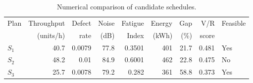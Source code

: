 \begin{table}[htbp]
\centering
\caption{Numerical comparison of candidate schedules.}
\label{tab:numerical-sim}
\small
\begin{tabular}{@{}lrrrrrrrl@{}}
\toprule
Plan & Throughput & Defect & Noise & Fatigue & Energy & Gap & V/R & Feasible \\
     & (units/h)  & rate   & (dB)  & Index   & (kWh)  & (\%) & score &         \\
\midrule
$S_{1}$ & 40.7 & 0.0079 & 77.8 & 0.3501 & 401 & 21.7 & 0.481 & Yes \\
$S_{2}$ & 48.2 & 0.01 & 84.9 & 0.6001 & 462 & 22.8 & 0.475 & No \\
$S_{3}$ & 25.7 & 0.0078 & 79.2 & 0.282 & 361 & 58.8 & 0.373 & Yes \\
\bottomrule
\end{tabular}
\end{table}
